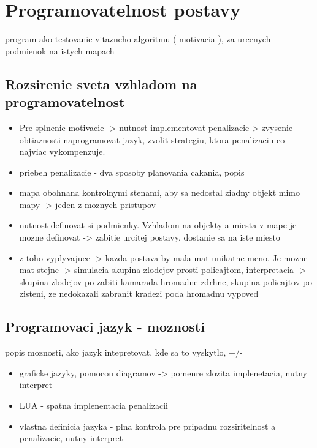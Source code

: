 \documentclass[12pt,notitlepage]{report}
\begin{document}
\section{Programovatelnost postavy}
program ako testovanie vitazneho algoritmu ( motivacia ), za urcenych podmienok na istych mapach
\subsection{Rozsirenie sveta vzhladom na programovatelnost}
\begin{itemize}
\item Pre splnenie motivacie -> nutnost  implementovat penalizacie-> zvysenie obtiaznosti naprogramovat jazyk, zvolit strategiu, ktora penalizaciu co najviac vykompenzuje. 
\item priebeh penalizacie  - dva sposoby planovania cakania, popis
\item mapa obohnana kontrolnymi stenami, aby sa nedostal ziadny objekt mimo mapy -> jeden z moznych pristupov
\item nutnost definovat si podmienky. Vzhladom na objekty a miesta v mape je mozne definovat -> zabitie urcitej postavy, dostanie sa na iste miesto
\item z toho vyplyvajuce -> kazda postava by mala mat unikatne meno. Je mozne mat stejne -> simulacia skupina zlodejov prosti policajtom, interpretacia -> skupina zlodejov po zabiti kamarada hromadne zdrhne, skupina policajtov po zisteni, ze nedokazali zabranit kradezi poda hromadnu vypoved
\end{itemize}
\subsection{Programovaci jazyk - moznosti}
popis moznosti, ako jazyk intepretovat, kde sa to vyskytlo, +/-
\begin{itemize}
\item graficke jazyky, pomocou diagramov -> pomenre zlozita implenetacia, nutny interpret
\item LUA - spatna implenentacia penalizacii
\item vlastna definicia jazyka - plna kontrola pre pripadnu rozsiritelnost a penalizacie, nutny interpret
\end{itemize}
\end{document}
